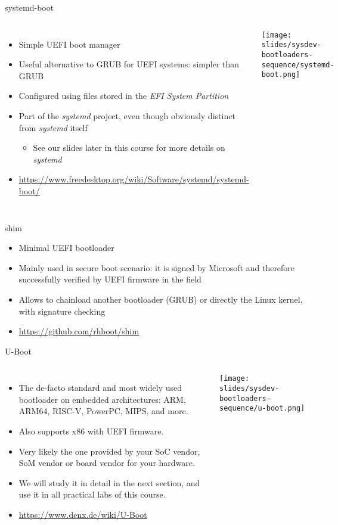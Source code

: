 \begin{frame}{systemd-boot}
  \begin{columns}[T]
    \begin{itemize}
    \item Simple UEFI boot manager
    \item Useful alternative to GRUB for UEFI systems: simpler than GRUB
    \item Configured using files stored in the {\em EFI System
        Partition}
    \item Part of the {\em systemd} project, even though obviously
      distinct from {\em systemd} itself
      \begin{itemize}
      \item See our slides later in this course for more details on {\em
          systemd}
      \end{itemize}
    \item \url{https://www.freedesktop.org/wiki/Software/systemd/systemd-boot/}
    \end{itemize}
    \texttt{[image: slides/sysdev-bootloaders-sequence/systemd-boot.png]}
  \end{columns}
\end{frame}

\begin{frame}{shim}
  \begin{itemize}
  \item Minimal UEFI bootloader
  \item Mainly used in secure boot scenario: it is signed by Microsoft
    and therefore successfully verified by UEFI firmware in the field
  \item Allows to chainload another bootloader (GRUB) or directly
    the Linux kernel, with signature checking
  \item \url{https://github.com/rhboot/shim}
  \end{itemize}
\end{frame}

\begin{frame}{U-Boot}
  \begin{columns}[T]
    \begin{itemize}
    \item The de-facto standard and most widely used bootloader on
      embedded architectures: ARM, ARM64, RISC-V, PowerPC, MIPS, and
      more.
    \item Also supports x86 with UEFI firmware.
    \item Very likely the one provided by your SoC vendor, SoM vendor
      or board vendor for your hardware.
    \item We will study it in detail in the next section, and use it in
      all practical labs of this course.
    \item \url{https://www.denx.de/wiki/U-Boot}
    \end{itemize}
    \texttt{[image: slides/sysdev-bootloaders-sequence/u-boot.png]}
  \end{columns}
\end{frame}

